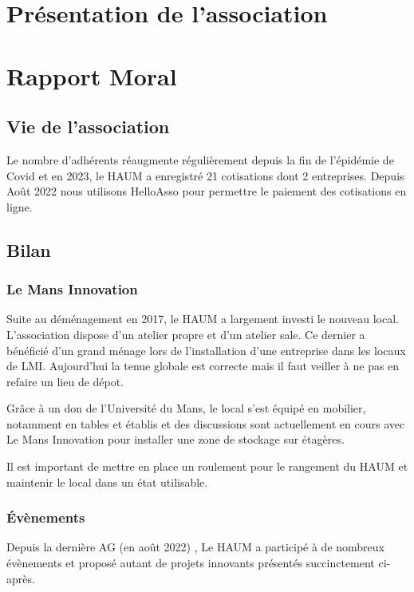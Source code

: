 \documentclass[11pt]{article}
\begin{document}
\section{Présentation de l'association}

\section{Rapport Moral}

\subsection{Vie de l'association}

Le nombre d'adhérents réaugmente régulièrement depuis la fin de l'épidémie de Covid et en
2023, le HAUM a enregistré 21 cotisations dont 2 entreprises.
Depuis Août 2022 nous utilisons HelloAsso pour permettre le paiement des cotisations en ligne.

\subsection{Bilan}

\subsubsection{Le Mans Innovation}

Suite au déménagement en 2017, le HAUM a largement investi le nouveau local. L'association dispose d'un atelier propre et d'un atelier sale. Ce dernier a bénéficié d'un grand ménage lors de l'installation d'une entreprise dans les locaux de LMI. Aujourd'hui la tenue globale est correcte mais il faut veiller à ne pas en refaire un lieu de dépot. 

Grâce à un don de l'Université du Mans, le local s'est équipé en mobilier, notamment en tables et établis et des discussions sont actuellement en cours avec Le Mans Innovation pour installer une zone de stockage sur étagères. 

Il est important de mettre en place un roulement pour le rangement du HAUM et maintenir le local dans un état utilisable.

\subsubsection{Évènements}

Depuis la dernière AG (en août 2022) , Le HAUM a participé à de nombreux évènements et proposé autant de
projets innovants présentés succinctement ci-après.
\end{document}
